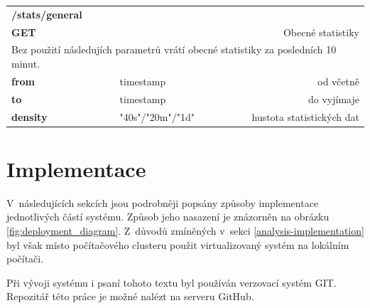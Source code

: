 \documentclass[thesis=B,czech]{FITthesis}[2012/06/26]
\begin{document}
\begin{table}[h]
\begin{tabular}{llllr}
\rowcolor[HTML]{EFEFEF}
\large \textbf{/stats/general}        &         &                 &        & \multicolumn{1}{l}{}                \\
\rowcolor[HTML]{EFEFEF}
\textbf{GET}          &         &                 &        & Obecné statistiky                        \\
\multicolumn{5}{l}{\parbox[t]{12.8cm}{Bez použití následujích parametrů vrátí obecné statistiky za posledních 10 minut.  }  } \\
\textbf{from}         &         & timestamp       &        & od včetně                           \\
\textbf{to}           &         & timestamp       &        & do vyjímaje                         \\
\textbf{density}        &         & "40s"/"20m"/"1d"         &        & hustota statistických dat   \\
\end{tabular}
\end{table}


\chapter{Implementace}
\label{implementace}
V~následujících sekcích jsou podrobněji popsány způsoby implementace jednotlivých částí systému. Způsob jeho nasazení je znázorněn na obrázku \ref{fig:deployment_diagram}. Z~důvodů zmíněných v~sekci \ref{analysis-implementation} byl však místo počítačového clusteru použit virtualizovaný systém na lokálním počítači. 

Při vývoji systému i psaní tohoto textu byl používán verzovací systém GIT. Repozitář této práce je možné nalézt na serveru GitHub\cite{github}. 
\end{document}
